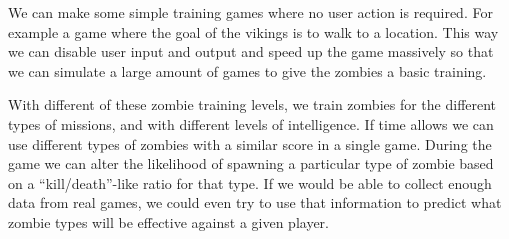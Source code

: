 We can make some simple training games where no user action is required. For example a game where the goal of the vikings is to walk to a location. This way we can disable user input and output and speed up the game massively so that we can simulate a large amount of games to give the zombies a basic training.

With different of these zombie training levels, we train zombies for the different types of missions, and with different levels of intelligence. If time allows we can use different types of zombies with a similar score in a single game. During the game we can alter the likelihood of spawning a particular type of zombie based on a ``kill/death''-like ratio for that type. If we would be able to collect enough data from real games, we could even try to use that information to predict what zombie types will be effective against a given player.

\FloatBarrier